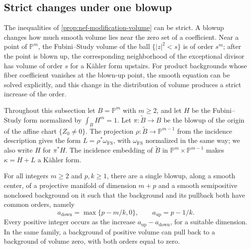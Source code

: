\subsection{Strict changes under one blowup}\label{sec:nef-strict-blowups}

The inequalities of \cref{prop:nef-modification-volume} can be strict. A blowup changes how much smooth volume lies near the zero set of a coefficient. Near a point of $\mathbb P^m$, the Fubini--Study volume of the ball $\{|z|^2<s\}$ is of order $s^m$; after the point is blown up, the corresponding neighborhood of the exceptional divisor has volume of order $s$ for a K\"ahler form upstairs. For product backgrounds whose fiber coefficient vanishes at the blown-up point, the smooth equation can be solved explicitly, and this change in the distribution of volume produces a strict increase of the order.

Throughout this subsection let $B=\mathbb P^m$ with $m\geq2$, and let $H$ be the Fubini--Study form normalized by $\int_BH^m=1$. Let $\pi\colon\widetilde B\to B$ be the blowup of the origin of the affine chart $\{Z_0\neq0\}$. The projection $\rho\colon\widetilde B\to\mathbb P^{m-1}$ from the incidence description gives the form $L=\rho^*\omega_{\mathrm{FS}}$, with $\omega_{\mathrm{FS}}$ normalized in the same way; we also write $H$ for $\pi^*H$. The incidence embedding of $\widetilde B$ in $\mathbb P^m\times\mathbb P^{m-1}$ makes $\kappa=H+L$ a K\"ahler form.

\begin{proposition}\label{prop:nef-strict-blowup-orders}
For all integers $m\geq2$ and $p,k\geq1$, there are a single blowup, along a smooth center, of a projective manifold of dimension $m+p$ and a smooth semipositive nonclosed background on it such that the background and its pullback both have common orders, namely
\[
 a_{\mathrm{down}}=\max\{p-m/k,0\},\qquad a_{\mathrm{up}}=p-1/k.
\]
Every positive integer occurs as the increase $a_{\mathrm{up}}-a_{\mathrm{down}}$, for a suitable dimension. In the same family, a background of positive volume can pull back to a background of volume zero, with both orders equal to zero.
\end{proposition}

